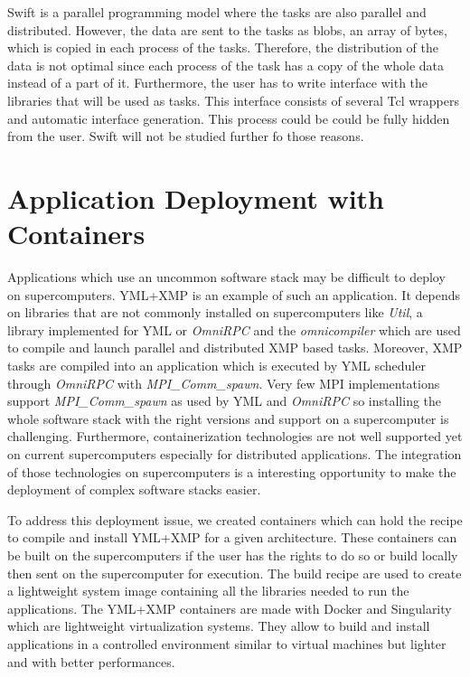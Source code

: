 Swift is a parallel programming model where the tasks are also parallel and distributed.
However, the data are sent to the tasks as blobs, an array of bytes, which is copied in each process of the tasks.
Therefore, the distribution of the data is not optimal since each process of the task has a copy of the whole data instead of a part of it.
Furthermore, the user has to write interface with the libraries that will be used as tasks.
This interface consists of several Tcl wrappers and automatic interface generation.
This process could be could be fully hidden from the user.
Swift will not be studied further fo those reasons.

\section{Application Deployment with Containers}
Applications which use an uncommon software stack may be difficult to deploy on supercomputers.
YML+XMP is an example of such an application.
It depends on libraries that are not commonly installed on supercomputers like \textit{Util}, a library implemented for YML or \textit{OmniRPC} and the \textit{omnicompiler} which are used to compile and launch parallel and distributed XMP based tasks.
Moreover, XMP tasks are compiled into an application which is executed by YML scheduler through \textit{OmniRPC} with \textit{MPI\_Comm\_spawn}.
Very few MPI implementations support \textit{MPI\_Comm\_spawn} as used by YML and \textit{OmniRPC} so installing the whole software stack with the right versions and support on a supercomputer is challenging.
Furthermore, containerization technologies are not well supported yet on current supercomputers especially for distributed applications.
The integration of those technologies on supercomputers is a interesting opportunity to make the deployment of complex software stacks easier.

To address this deployment issue, we created containers which can hold the recipe to compile and install YML+XMP for a given architecture.
These containers can be built on the supercomputers if the user has the rights to do so or build locally then sent on the supercomputer for execution.
The build recipe are used to create a lightweight system image containing all the libraries needed to run the applications.
The YML+XMP containers are made with Docker and Singularity which are lightweight virtualization systems.
They allow to build and install applications in a controlled environment similar to virtual machines but lighter and with better performances.

